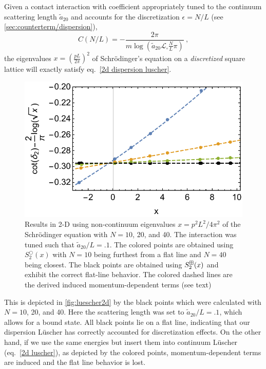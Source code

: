 Given a contact interaction with coefficient appropriately tuned to the continuum scattering length $\tilde a_{20}$ and accounts for the discretization $\epsilon=N/L$ (see \autoref{sec:counterterm/dispersion}),
\begin{equation}
C(N/L)=-\frac{2 \pi}{m \log \left(\tilde a_{20} \mathcal{L}_\square \frac{N}{L}\pi\right)}\ ,
\end{equation}
the eigenvalues $x=\left(\frac{pL}{2\pi}\right)^2$ of Schr\"odinger's equation on a \emph{discretized} square lattice will exactly satisfy eq.~\eqref{2d dispersion luscher}.
\begin{figure}
\center
\includegraphics[width=.65\textwidth]{figure/luescher2d.pdf}
\caption{Results in 2-D using non-continuum eigenvalues $x=p^2L^2/4\pi^2$ of the Schr\"odinger equation with $N=10$, 20, and 40.  The interaction was tuned such that $\tilde a_{20}/L=.1$.  The colored points are obtained using $S^\bigcirc_2(x)$ with $N=10$ being furthest from a flat line and $N=40$ being closest.  The black points are obtained using $S^{\boxplus}_2(x)$  and exhibit the correct flat-line behavior.  The colored dashed lines are the derived induced momentum-dependent terms (see text) \label{fig:luescher2d}}
\end{figure}
This is depicted in \autoref{fig:luescher2d} by the black points which were calculated with $N=10$, 20, and 40.  Here the scattering length was set to $\tilde a_{20}/L = .1$, which allows for a bound state.  All black points lie on a flat line, indicating that our dispersion L\"uscher has correctly accounted for discretization effects.  On the other hand, if we use the same energies but insert them into continuum L\"uscher (eq.~\eqref{2d luscher}), as depicted by the colored points, momentum-dependent terms are induced and the flat line behavior is lost.

